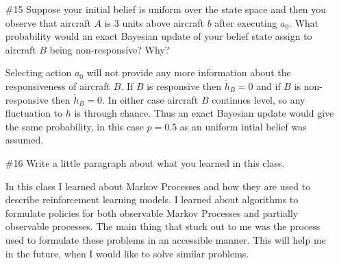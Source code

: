 \documentclass[12pt, oneside]{article}
\begin{document}
\begin{enumerate}
  \item[\#15] %
    Suppose your initial belief is uniform over the state space and then you
    observe that aircraft $A$ is $3$ units above aircraft $b$ after executing
    $a_0$.
    What probability would an exact Bayesian update of your belief state assign to
    aircraft $B$ being non-responsive?
    Why?

    Selecting action $a_0$ will not provide any more information about the
    responsiveness of aircraft $B$.
    If $B$ is responsive then $\dot{h}_B = 0$ and if $B$ is non-responsive then
    $\dot{h}_B = 0$.
    In either case aircraft $B$ continues level, so any fluctuation to $h$ is
    through chance.
    Thus an exact Bayesian update would give the same probability, in this
    case $p = 0.5$ as an uniform intial belief was assumed.

  \item[\#16] %
    Write a little paragraph about what you learned in this class.

    In this class I learned about Markov Processes and how they are used to
    describe reinforcement learning models.
    I learned about algorithms to formulate policies for both observable
    Markov Processes and partially observable processes.
    The main thing that stuck out to me was the process used to formulate these
    problems in an accessible manner.
    This will help me in the future, when I would like to solve similar
    problems.
\end{enumerate}
\end{document}
